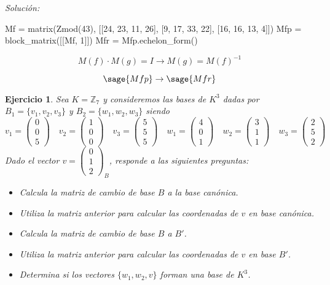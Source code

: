 \documentclass{amsart}
\newtheorem{ejer}{Ejercicio}
\begin{document}
{\it Solución: }


\begin{sageblock}
	Mf = matrix(Zmod(43), [[24, 23, 11, 26], [9, 17, 33, 22], [16, 16, 13, 4]])
	Mfp = block_matrix([[Mf, 1]])
	Mfr = Mfp.echelon_form()
\end{sageblock}

$$
	M(f) \cdot M(g) = I \to M(g) = M(f)^{-1}
$$


$$
	\sage{Mfp} \to \sage{Mfr}
$$


\begin{ejer}
Sea $K = {\mathbb Z}_{7}$ y consideremos las bases de $K^3$ dadas por
$ B_1 = \{v_1,v_2,v_3\}$ y $B_2 = \{w_1,w_2,w_3\}$
siendo 
$$
v_1 = \left(\begin{array}{r}
0 \\
0 \\
5
\end{array}\right) \quad 
v_2 = \left(\begin{array}{r}
1 \\
0 \\
0
\end{array}\right) \quad
v_3 = \left(\begin{array}{r}
5 \\
5 \\
5
\end{array}\right)
\quad
w_1 = \left(\begin{array}{r}
4 \\
0 \\
1
\end{array}\right) \quad
w_2 = \left(\begin{array}{r}
3 \\
1 \\
1
\end{array}\right) \quad
w_3 = \left(\begin{array}{r}
2 \\
5 \\
2
\end{array}\right)
$$
Dado el vector $v = \left(\begin{array}{r}
0 \\
1 \\
2
\end{array}\right)_B$, responde a las siguientes preguntas:
\begin{itemize}
\item Calcula la matriz de cambio de base $B$ a la base canónica.
\item Utiliza la matriz anterior para calcular las coordenadas de
$v$ en base canónica.
\item Calcula la matriz de cambio de base $B$ a $B'$.
\item Utiliza la matriz anterior para calcular las coordenadas de
$v$ en base $B'$.
\item Determina si los vectores $\{w_1,w_2,v\}$ forman una base
de $K^3$.
\end{itemize}
\end{ejer}
\end{document}
